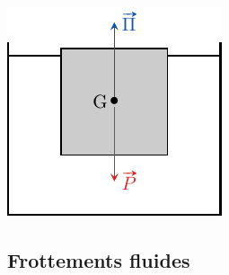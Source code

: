 \documentclass[../../main/main.tex]{subfiles}
\begin{document}
\begin{tcb}[breakable]
\begin{isd}[righthand ratio=.22]
\begin{center}
{			}{
				\includegraphics[width=\linewidth]{glacon}
			}
			\vspace{-15pt}
		\end{center}
	\end{isd}
	\vspace{-15pt}
\end{tcb}

\subsection{Frottements fluides}
\end{document}
